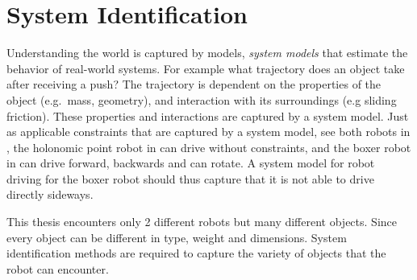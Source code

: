 \section{System Identification}%
\label{sec:sys_iden}
Understanding the world is captured by models, \textit{system models} that estimate the behavior of real-world systems. For example what trajectory does an object take after receiving a push? The trajectory is dependent on the properties of the object (e.g.~mass, geometry), and interaction with its surroundings (e.g sliding friction). These properties and interactions are captured by a system model. Just as applicable constraints that are captured by a system model, see both robots in , the holonomic point robot in  can drive without constraints, and the boxer robot in  can drive forward, backwards and can rotate. A system model for robot driving for the boxer robot should thus capture that it is not able to drive directly sideways.\bs

This thesis encounters only 2 different robots but many different objects. Since every object can be different in type, weight and dimensions. System identification methods are required to capture the variety of objects that the robot can encounter.\bs


